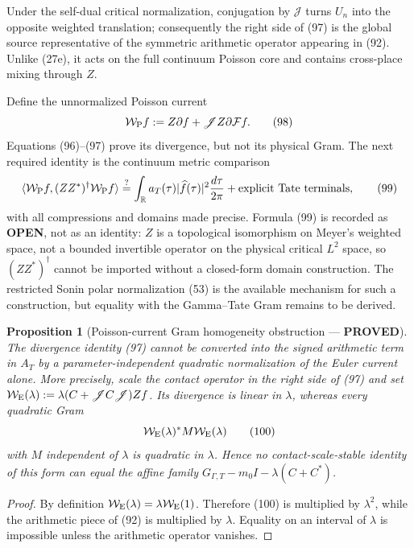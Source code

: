 \documentclass[11pt]{article}
\newtheorem{proposition}[theorem]{Proposition}
\newcommand{\PROVED}{\textcolor{green!45!black}{\textbf{PROVED}}}
\newcommand{\OPEN}{\textcolor{red!70!black}{\textbf{OPEN}}}
\begin{document}
Under the self-dual critical normalization, conjugation by $\mathscr J$
turns $U_n$ into the opposite weighted translation; consequently the right
side of (97) is the global source representative of the symmetric arithmetic
operator appearing in (92).  Unlike (27e), it acts on the full continuum
Poisson core and contains cross-place mixing through $Z$.

Define the unnormalized Poisson current
\begin{equation}
 \mathcal W_{\rm P}f:=Z\partial f+\mathscr JZ\partial\mathcal Ff. \tag{98}
\end{equation}
Equations (96)--(97) prove its divergence, but not its physical Gram.  The
next required identity is the continuum metric comparison
\begin{equation}
 \langle\mathcal W_{\rm P}f,
          (ZZ^*)^\dagger\mathcal W_{\rm P}f\rangle
 \stackrel{?}{=}
 \int_{\mathbb R}a_T(\tau)|\widehat f(\tau)|^2
       \frac{d\tau}{2\pi}+\text{explicit Tate terminals},       \tag{99}
\end{equation}
with all compressions and domains made precise.  Formula (99) is recorded as
\OPEN{}, not as an identity: $Z$ is a topological isomorphism on Meyer's
weighted space, not a bounded invertible operator on the physical critical
$L^2$ space, so $(ZZ^*)^\dagger$ cannot be imported without a closed-form
domain construction.  The restricted Sonin polar normalization (53) is the
available mechanism for such a construction, but equality with the
Gamma--Tate Gram remains to be derived.

\begin{proposition}[Poisson-current Gram homogeneity obstruction --- \PROVED]
The divergence identity (97) cannot be converted into the signed arithmetic
term in $A_T$ by a parameter-independent quadratic normalization of the
Euler current alone.  More precisely, scale the contact operator in the
right side of (97) and set
$\mathcal W_{\rm E}(\lambda):=\lambda(C+\mathscr JC\mathscr J)Zf$.
Its divergence is linear in $\lambda$, whereas every quadratic Gram
\begin{equation}
 \mathcal W_{\rm E}(\lambda)^*M\mathcal W_{\rm E}(\lambda) \tag{100}
\end{equation}
with $M$ independent of $\lambda$ is quadratic in $\lambda$.  Hence no
contact-scale-stable identity of this form can equal the affine family
$G_{\Gamma,T}-m_0I-\lambda(C+C^*)$.
\end{proposition}

\begin{proof}
By definition
$\mathcal W_{\rm E}(\lambda)=\lambda\mathcal W_{\rm E}(1)$.
Therefore (100) is multiplied by $\lambda^2$, while the arithmetic
piece of (92) is multiplied by $\lambda$.  Equality on an interval of
$\lambda$ is impossible unless the arithmetic operator vanishes.
\end{proof}
\end{document}
